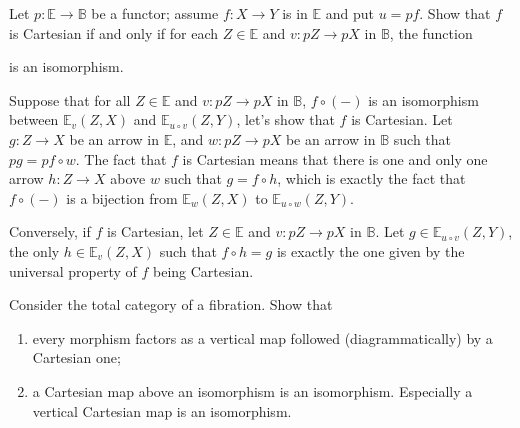 \documentclass{report}
\newcommand{\bE}[0]{\mathbb E}
\newcommand{\bB}[0]{\mathbb B}
\begin{document}
\begin{exo}
    Let $p : \bE\to\bB$ be a functor; assume $f : X \to Y$ is in $\bE$ and put $u = pf$. Show that $f$
    is Cartesian if and only if for each $Z \in \bE$ and $v : pZ\to pX$ in $\bB$, the function
    \begin{center}
    \end{center}
    is an isomorphism.
\end{exo}

\begin{answer}
    Suppose that for all $Z\in \bE$ and $v : pZ\to pX$ in $\bB$, $f\circ(-)$ is an isomorphism between
    $\bE_v(Z,X)$ and $\bE_{u\circ v}(Z,Y)$, let's show that $f$ is Cartesian. Let $g : Z \to X$ be an arrow in
    $\bE$, and $w : pZ \to pX$ be an arrow in $\bB$ such that $pg = pf\circ w$. The fact that $f$ is Cartesian
    means that there is one and only one arrow $h : Z \to X$ above $w$ such that $g = f\circ h$, which is
    exactly the fact that $f\circ(-)$ is a bijection from $\bE_{w}(Z,X)$ to $\bE_{u\circ w}(Z,Y)$.

    Conversely, if $f$ is Cartesian, let $Z \in \bE$ and $v : pZ \to pX$ in $\bB$. Let $g \in \bE_{u\circ v}
    (Z,Y)$, the only $h\in \bE_v(Z,X)$ such that $f\circ h = g$ is exactly the one given by the universal
    property of $f$ being Cartesian.
\end{answer}

\begin{exo}
    Consider the total category of a fibration. Show that
    \begin{enumerate}[label=(\roman*)]
        \item every morphism factors as a vertical map followed (diagrammatically) by a Cartesian one;
        \item\label{1.1.1.3.ii} a Cartesian map above an isomorphism is an isomorphism. Especially a
        vertical Cartesian map is an isomorphism.
    \end{enumerate}
\end{exo}
\end{document}
